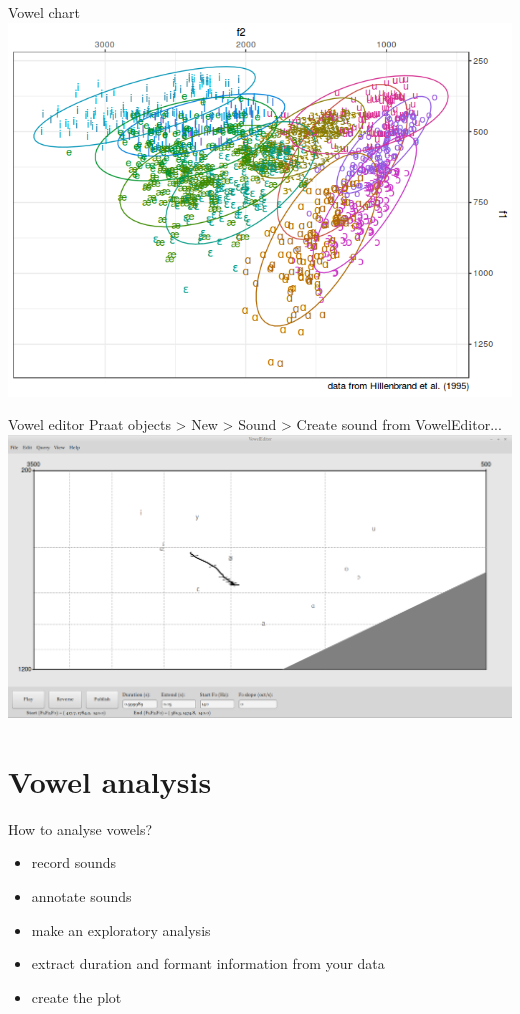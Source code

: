 \begin{frame}{Vowel chart}
\includegraphics[width=\linewidth]{03-vowel-chart.png}
\end{frame}

\begin{frame}{Vowel editor}
Praat objects > New > Sound > Create sound from VowelEditor...
\includegraphics[width=\linewidth]{04-vowel-editor.png}
\end{frame}


\section{Vowel analysis}
\begin{frame}{How to analyse vowels?}
\begin{itemize}
\item record sounds
\item annotate sounds
\item make an exploratory analysis
\item extract duration and formant information from your data
\item create the plot
\end{itemize}
\end{frame}


